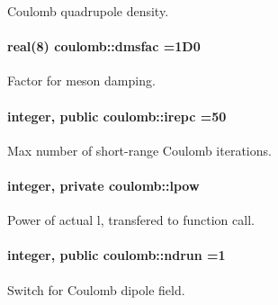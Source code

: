 Coulomb quadrupole density. 

\paragraph[{\texorpdfstring{dmsfac}{dmsfac}}]{\setlength{\rightskip}{0pt plus 5cm}real(8) coulomb\+::dmsfac =1\+D0}\hypertarget{namespacecoulomb_aa59198776eee2c212c28eff84880b2bb}{}\label{namespacecoulomb_aa59198776eee2c212c28eff84880b2bb}


Factor for meson damping. 

\paragraph[{\texorpdfstring{irepc}{irepc}}]{\setlength{\rightskip}{0pt plus 5cm}integer, public coulomb\+::irepc =50}\hypertarget{namespacecoulomb_abbd920ad240f2299a64eb8a558453958}{}\label{namespacecoulomb_abbd920ad240f2299a64eb8a558453958}


Max number of short-\/range Coulomb iterations. 

\paragraph[{\texorpdfstring{lpow}{lpow}}]{\setlength{\rightskip}{0pt plus 5cm}integer, private coulomb\+::lpow\hspace{0.3cm}{\ttfamily [private]}}\hypertarget{namespacecoulomb_a3a24d1e9e066766553253e002f7114e0}{}\label{namespacecoulomb_a3a24d1e9e066766553253e002f7114e0}


Power of actual \textquotesingle{}l\textquotesingle{}, transfered to function call. 

\paragraph[{\texorpdfstring{ndrun}{ndrun}}]{\setlength{\rightskip}{0pt plus 5cm}integer, public coulomb\+::ndrun =1}\hypertarget{namespacecoulomb_a3a4d72dad873e26eea3e8489927259a8}{}\label{namespacecoulomb_a3a4d72dad873e26eea3e8489927259a8}


Switch for Coulomb dipole field. 

